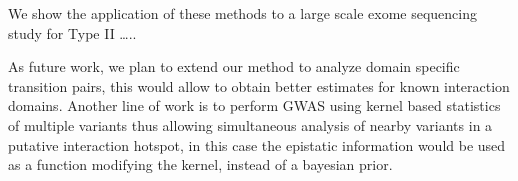 We show the application of these methods to a large scale exome sequencing study for Type II …..

As future work, we plan to extend our method to analyze domain specific transition pairs, this would allow to obtain better estimates for known interaction domains. Another line of work is to perform GWAS using kernel based statistics of multiple variants \cite{wu2011rare} thus allowing simultaneous analysis of nearby variants in a putative interaction hotspot, in this case the epistatic information would be used as a function modifying the kernel, instead of a bayesian prior.

% 
% 
%  
% 
% 
% 
% 
